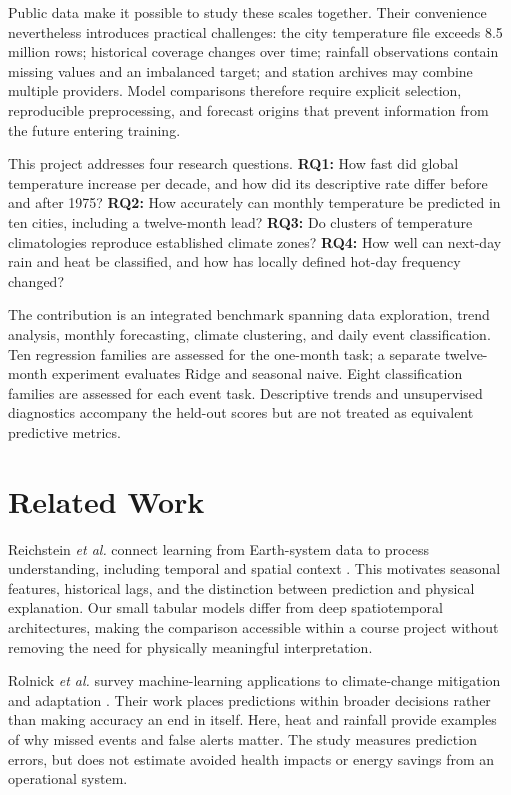 \documentclass[conference]{IEEEtran}
\begin{document}
Public data make it possible to study these scales together. Their convenience nevertheless introduces practical challenges: the city temperature file exceeds 8.5 million rows; historical coverage changes over time; rainfall observations contain missing values and an imbalanced target; and station archives may combine multiple providers. Model comparisons therefore require explicit selection, reproducible preprocessing, and forecast origins that prevent information from the future entering training.

This project addresses four research questions. \textbf{RQ1:} How fast did global temperature increase per decade, and how did its descriptive rate differ before and after 1975? \textbf{RQ2:} How accurately can monthly temperature be predicted in ten cities, including a twelve-month lead? \textbf{RQ3:} Do clusters of temperature climatologies reproduce established climate zones? \textbf{RQ4:} How well can next-day rain and heat be classified, and how has locally defined hot-day frequency changed?

The contribution is an integrated benchmark spanning data exploration, trend analysis, monthly forecasting, climate clustering, and daily event classification. Ten regression families are assessed for the one-month task; a separate twelve-month experiment evaluates Ridge and seasonal naive. Eight classification families are assessed for each event task. Descriptive trends and unsupervised diagnostics accompany the held-out scores but are not treated as equivalent predictive metrics.

\section{Related Work}
Reichstein \emph{et al.} connect learning from Earth-system data to process understanding, including temporal and spatial context \cite{reichstein}. This motivates seasonal features, historical lags, and the distinction between prediction and physical explanation. Our small tabular models differ from deep spatiotemporal architectures, making the comparison accessible within a course project without removing the need for physically meaningful interpretation.

Rolnick \emph{et al.} survey machine-learning applications to climate-change mitigation and adaptation \cite{rolnick}. Their work places predictions within broader decisions rather than making accuracy an end in itself. Here, heat and rainfall provide examples of why missed events and false alerts matter. The study measures prediction errors, but does not estimate avoided health impacts or energy savings from an operational system.
\end{document}
